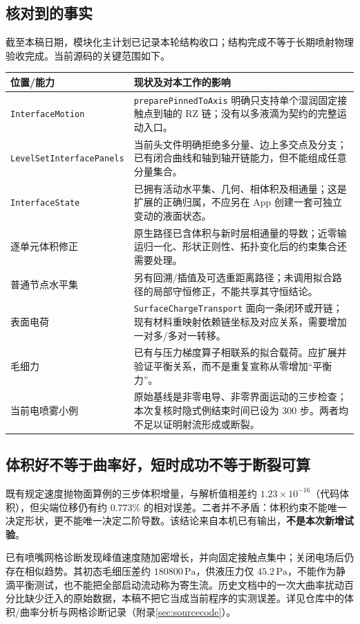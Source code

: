 \documentclass[11pt,a4paper]{article}
\newcommand{\code}[1]{{\small\nolinkurl{#1}}}
\begin{document}
\subsection{核对到的事实}
截至本稿日期，模块化主计划已记录本轮结构收口；结构完成不等于长期喷射物理验收完成。当前源码的关键范围如下。
\begin{longtable}{L{36mm}L{115mm}}
\toprule 位置/能力 & 现状及对本工作的影响\\\midrule\endhead
\code{InterfaceMotion} & \code{preparePinnedToAxis} 明确只支持单个湿润固定接触点到轴的 RZ 链；没有以多液滴为契约的完整运动入口。\\
\code{LevelSetInterfacePanels} & 当前头文件明确拒绝多分量、边上多交点及分支；已有闭合曲线和轴到轴开链能力，但不能组成任意分量集合。\\
\code{InterfaceState} & 已拥有活动水平集、几何、相体积及相通量；这是扩展的正确归属，不应另在 App 创建一套可独立变动的液面状态。\\
逐单元体积修正 & 原生路径已含体积与新时层相通量的导数；近零输运归一化、形状正则性、拓扑变化后的约束集合还需要处理。\\
普通节点水平集 & 另有回溯/插值及可选重距离路径；未调用拟合路径的局部守恒修正，不能共享其守恒结论。\\
表面电荷 & \code{SurfaceChargeTransport} 面向一条闭环或开链；现有材料重映射依赖链坐标及对应关系，需要增加一对多/多对一转移。\\
毛细力 & 已有与压力梯度算子相联系的拟合载荷。应扩展并验证平衡关系，而不是重复宣称从零增加“平衡力”。\\
当前电喷雾小例 & 原始基线是非零电导、非零界面运动的三步检查；本次复核时隐式例结束时间已设为 300 步。两者均不足以证明射流形成或断裂。\\\bottomrule
\end{longtable}

\subsection{体积好不等于曲率好，短时成功不等于断裂可算}
既有规定速度抛物面算例的三步体积增量，与解析值相差约 $1.23\times10^{-16}$（代码体积），但尖端位移仍有约 $0.773\%$ 的相对误差。二者并不矛盾：体积约束不能唯一决定形状，更不能唯一决定二阶导数。该结论来自本机已有输出，\textbf{不是本次新增试验}。

已有喷嘴网格诊断发现峰值速度随加密增长，并向固定接触点集中；关闭电场后仍存在相似趋势。其初态毛细压差约 $180800\,\mathrm{Pa}$，供液压力仅 $45.2\,\mathrm{Pa}$，不能作为静滴平衡测试，也不能把全部启动流动称为寄生流。历史文档中的一次大曲率扰动百分比缺少迁入的原始数据，本稿不把它当成当前程序的实测误差。详见仓库中的体积/曲率分析与网格诊断记录（附录\ref{sec:sourcecode}）。
\end{document}
